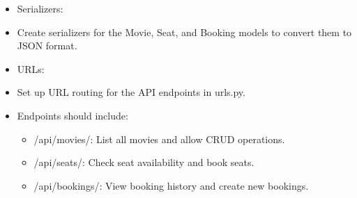 \documentclass{article}
\begin{document}
\begin{itemize}
    \item Serializers:
\end{itemize}
\begin{itemize}
    \begin{itemize}
        \item Create serializers for the Movie, Seat, and Booking models to convert them to JSON format.
    \end{itemize}
\end{itemize}
\begin{itemize}
    \item URLs:
\end{itemize}
\begin{itemize}
    \begin{itemize}
        \item Set up URL routing for the API endpoints in urls.py.
    \end{itemize}
\end{itemize}
\begin{itemize}
    \begin{itemize}
        \begin{itemize}
            \item Endpoints should include:
            \begin{itemize}
                \item /api/movies/: List all movies and allow CRUD operations.
            \end{itemize}
            \begin{itemize}
                \item /api/seats/: Check seat availability and book seats.
            \end{itemize}
            \begin{itemize}
                \item /api/bookings/: View booking history and create new bookings.
            \end{itemize}
        \end{itemize}
    \end{itemize}
\end{itemize}
\end{document}
